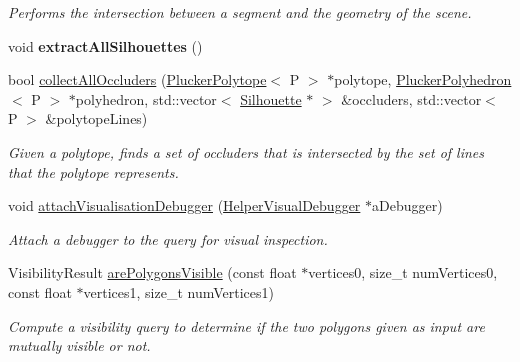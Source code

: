\begin{DoxyCompactItemize}
\begin{DoxyCompactList}\small\item\em Performs the intersection between a segment and the geometry of the scene. \end{DoxyCompactList}\item 
\mbox{\label{classvisilib_1_1_visibility_exact_query___a44b86e8d38107ae316862478548f4e40}} 
void {\bfseries extract\+All\+Silhouettes} ()
\item 
bool \mbox{\hyperlink{classvisilib_1_1_visibility_exact_query___a37d430f305c3024cc8ab9efb7dbaf534}{collect\+All\+Occluders}} (\mbox{\hyperlink{classvisilib_1_1_plucker_polytope}{Plucker\+Polytope}}$<$ P $>$ $\ast$polytope, \mbox{\hyperlink{classvisilib_1_1_plucker_polyhedron}{Plucker\+Polyhedron}}$<$ P $>$ $\ast$polyhedron, std\+::vector$<$ \mbox{\hyperlink{classvisilib_1_1_silhouette}{Silhouette}} $\ast$ $>$ \&occluders, std\+::vector$<$ P $>$ \&polytope\+Lines)
\begin{DoxyCompactList}\small\item\em Given a polytope, finds a set of occluders that is intersected by the set of lines that the polytope represents. \end{DoxyCompactList}\item 
\mbox{\label{classvisilib_1_1_visibility_exact_query___aaf24602cc5844a5ef5f7ae6fe3df0f56}} 
void \mbox{\hyperlink{classvisilib_1_1_visibility_exact_query___aaf24602cc5844a5ef5f7ae6fe3df0f56}{attach\+Visualisation\+Debugger}} (\mbox{\hyperlink{classvisilib_1_1_helper_visual_debugger}{Helper\+Visual\+Debugger}} $\ast$a\+Debugger)
\begin{DoxyCompactList}\small\item\em Attach a debugger to the query for visual inspection. \end{DoxyCompactList}\item 
\mbox{\label{classvisilib_1_1_visibility_exact_query___a615c47cec68794e091d30852e959dbb9}} 
Visibility\+Result \mbox{\hyperlink{classvisilib_1_1_visibility_exact_query___a615c47cec68794e091d30852e959dbb9}{are\+Polygons\+Visible}} (const float $\ast$vertices0, size\+\_\+t num\+Vertices0, const float $\ast$vertices1, size\+\_\+t num\+Vertices1)
\begin{DoxyCompactList}\small\item\em Compute a visibility query to determine if the two polygons given as input are mutually visible or not. \end{DoxyCompactList}\item 

\end{DoxyCompactItemize}
